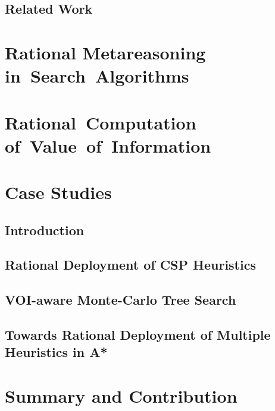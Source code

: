 \documentclass[oneside,a4paper]{report}
\begin{document}
\section{Related Work}
\label{sec:related}


\chapter{Rational Metareasoning in~Search~Algorithms}
\label{ch:ramesrch}


\chapter{Rational~Computation of~Value~of~Information}
\label{ch:raticomp}


\chapter{Case Studies}
\label{ch:case-studies}
\section{Introduction}
\label{sec:cs-intro}


\clearpage
\section{Rational Deployment of CSP Heuristics}
\label{sec:cs-csp}


\clearpage
\section{VOI-aware Monte-Carlo Tree Search}
\label{sec:cs-mcts}


\clearpage
\section{Towards Rational Deployment of Multiple Heuristics in A*}
\label{sec:cs-rla}


\chapter {Summary and Contribution}
\label{ch:summary}




\end{document}
